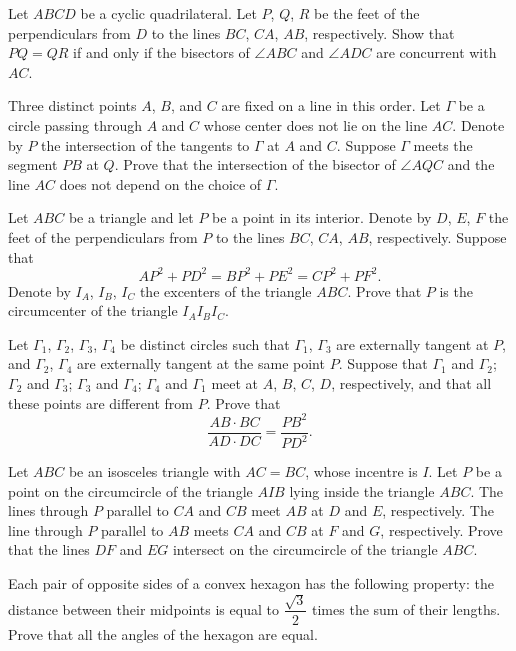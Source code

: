 
\item[\textbf{G1.}]Let $ABCD$ be a cyclic quadrilateral. Let $P$,  $Q$,  $R$ be the feet of the perpendiculars from $D$ to the lines $BC$,  $CA$,  $AB$,  respectively. Show that $PQ=QR$ if and only if the bisectors of $\angle ABC$ and $\angle ADC$ are concurrent with $AC$.
\item[\textbf{G2.}]Three distinct points $A$,  $B$,  and $C$ are fixed on a line in this order.  Let $\Gamma$ be a circle passing through $A$ and $C$ whose center does not lie on the line $AC$.  Denote by $P$ the intersection of the tangents to $\Gamma$ at $A$ and $C$.  Suppose $\Gamma$ meets the segment $PB$ at $Q$.  Prove that the intersection of the bisector of $\angle AQC$ and the line $AC$ does not depend on the choice of $\Gamma$.
\item[\textbf{G3.}]Let $ABC$ be a triangle and let $P$ be a point in its interior.  Denote by $D$,  $E$,  $F$ the feet of the perpendiculars from $P$ to the lines $BC$,  $CA$,  $AB$,  respectively.  Suppose that \[AP^2 + PD^2 = BP^2 + PE^2 = CP^2 + PF^2.\]Denote by $I_A$,  $I_B$,  $I_C$ the excenters of the triangle $ABC$.  Prove that $P$ is the circumcenter of the triangle $I_AI_BI_C$.
\item[\textbf{G4.}]Let $\Gamma_1$,  $\Gamma_2$,  $\Gamma_3$,  $\Gamma_4$ be distinct circles such that $\Gamma_1$,  $\Gamma_3$ are externally tangent at $P$,  and $\Gamma_2$,  $\Gamma_4$ are externally tangent at the same point $P$. Suppose that $\Gamma_1$ and $\Gamma_2$; $\Gamma_2$ and $\Gamma_3$; $\Gamma_3$ and $\Gamma_4$; $\Gamma_4$ and $\Gamma_1$ meet at $A$,  $B$,  $C$,  $D$,  respectively, and that all these points are different from $P$. Prove that\[
  \frac{AB\cdot BC}{AD\cdot DC}=\frac{PB^2}{PD^2}.
 \]
\item[\textbf{G5.}]Let $ABC$ be an isosceles triangle with $AC=BC$,  whose incentre is $I$. Let $P$ be a point on the circumcircle of the triangle $AIB$ lying inside the triangle $ABC$. The lines through $P$ parallel to $CA$ and $CB$ meet $AB$ at $D$ and $E$,  respectively. The line through $P$ parallel to $AB$ meets $CA$ and $CB$ at $F$ and $G$,  respectively. Prove that the lines $DF$ and $EG$ intersect on the circumcircle of the triangle $ABC$.

\item[\textbf{G6.}]Each pair of opposite sides of a convex hexagon has the following property: the distance between their midpoints is equal to  $\dfrac{\sqrt{3}}{2}$ times the sum of their lengths. Prove that all the angles of the hexagon are equal.

